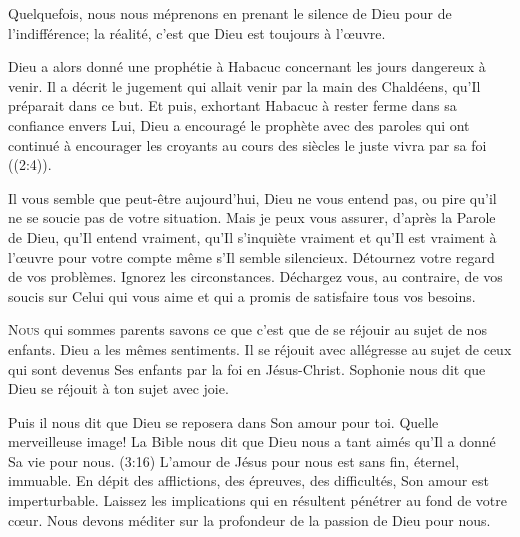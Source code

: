 
Quelquefois, nous nous méprenons en prenant le silence de Dieu
 pour de l'indifférence; la réalité, c'est que Dieu est toujours à l'\oe{}uvre. 

Dieu a alors donné une prophétie à Habacuc concernant les jours dangereux
 à venir. Il a décrit le jugement qui allait venir par la main des Chaldéens,
 qu'Il préparait dans ce but. Et puis, exhortant Habacuc à rester ferme
 dans sa confiance envers Lui, Dieu a encouragé le prophète avec des paroles
 qui ont continué à encourager les croyants au cours des siècles\frcolon{}
 \Og le juste vivra par sa foi \Fg{} ((2:4)). 

Il vous semble que peut-être aujourd'hui, Dieu ne vous entend pas, ou pire
 \ocadr qu'il ne se soucie pas de votre situation. Mais je peux vous assurer,
 d'après la Parole de Dieu, qu'Il entend vraiment,
 qu'Il s'inquiète vraiment et qu'Il est vraiment à l'\oe{}uvre pour votre compte
 \ocadr même s'Il semble silencieux. Détournez votre regard de vos problèmes.
 Ignorez les circonstances. Déchargez vous, au contraire, de vos soucis
 sur Celui qui vous aime et qui a promis de satisfaire tous vos besoins. 

\dvrule






\lettrine{N}{ous} qui sommes parents savons ce que c'est que de se réjouir
 au sujet de nos enfants. Dieu a les mêmes sentiments.
 Il se réjouit avec allégresse au sujet de ceux qui sont devenus
 Ses enfants par la foi en Jésus-Christ. Sophonie nous dit que
 \Og Dieu se réjouit à ton sujet avec joie. \Fg{}

Puis il nous dit que Dieu \Og se reposera dans Son amour pour toi. \Fg{}
 Quelle merveilleuse image! La Bible nous dit que Dieu nous a tant aimés
 qu'Il a donné Sa vie pour nous. (3:16)
 L'amour de Jésus pour nous est sans fin, éternel, immuable.
 En dépit des afflictions, des épreuves, des difficultés,
 Son amour est imperturbable. Laissez les implications qui en résultent
 pénétrer  au fond de votre c\oe{}ur.
 Nous devons méditer sur la profondeur de la passion de Dieu pour nous. 

